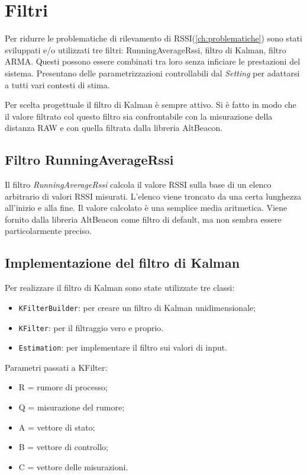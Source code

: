\section{Filtri}
Per ridurre le problematiche di rilevamento di RSSI(\ref{ch:problematiche}) sono stati sviluppati e/o utilizzati tre filtri: RunningAverageRssi, filtro di Kalman, filtro ARMA. Questi possono essere combinati tra loro senza inficiare le prestazioni del sistema. Presentano delle parametrizzazioni controllabili dal \textit{Setting} per adattarsi a tutti vari contesti di stima.

Per scelta progettuale il filtro di Kalman è sempre attivo. Si è fatto in modo che il valore filtrato col questo filtro sia confrontabile con la misurazione della distanza RAW e con quella filtrata dalla libreria AltBeacon.

\subsection{Filtro RunningAverageRssi}
Il filtro \textit{RunningAverageRssi} calcola il valore RSSI sulla base di un elenco arbitrario di valori RSSI misurati. L'elenco viene troncato da una certa lunghezza all'inizio e alla fine. Il valore calcolato è una semplice media aritmetica. Viene fornito dalla libreria AltBeacon come filtro di default, ma non sembra essere particolarmente preciso.

\subsection{Implementazione del filtro di Kalman}

Per realizzare il filtro di Kalman sono state utilizzate tre classi: 
\begin{itemize}
	\item \texttt{KFilterBuilder}: per creare un filtro di Kalman unidimensionale;
	\item \texttt{KFilter}: per il filtraggio vero e proprio.
	\item \texttt{Estimation}: per implementare il filtro sui valori di input.
\end{itemize}
Parametri passati a KFilter:
\begin{itemize}
	\item R = rumore di processo;
	\item Q = misurazione del rumore;
	\item A = vettore di stato;
	\item B = vettore di controllo;
	\item C = vettore delle misurazioni.
\end{itemize}

